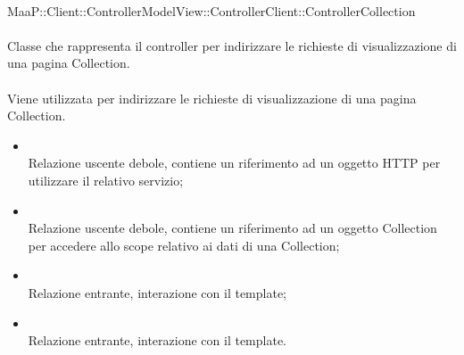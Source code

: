 \\
MaaP::Client::ControllerModelView::ControllerClient::ControllerCollection\\
\\
Classe che rappresenta il controller per indirizzare le richieste di visualizzazione di una pagina Collection.\\
\\
Viene utilizzata per indirizzare le richieste di visualizzazione di una pagina Collection.\\
\begin{itemize}
\item{}\\
Relazione uscente debole, contiene un riferimento ad un oggetto HTTP per utilizzare il relativo servizio;
\item{}\\
Relazione uscente debole, contiene un riferimento ad un oggetto Collection per accedere allo scope relativo ai dati di una Collection;
\item{}\\
Relazione entrante, interazione con il template;
\item{}\\
Relazione entrante, interazione con il template.
\end{itemize}

